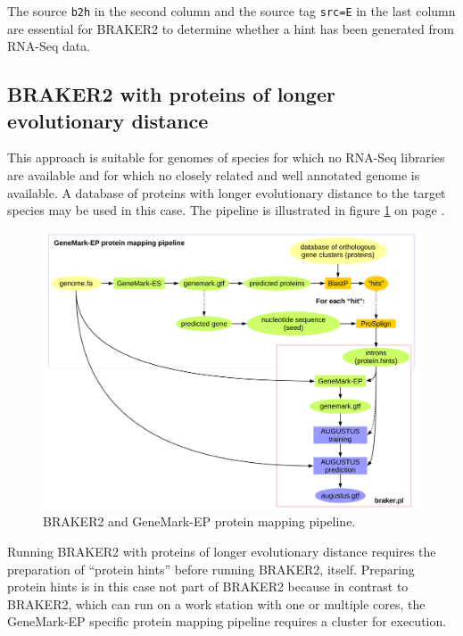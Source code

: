 \documentclass[a4paper,10pt]{report}
\begin{document}
The source \texttt{b2h} in the second column and the source tag \texttt{src=E} in the last column are essential for BRAKER2 to determine whether a hint has been generated from RNA-Seq data. 

\subsection{BRAKER2 with proteins of longer evolutionary distance}

This approach is suitable for genomes of species for which no RNA-Seq libraries are available and for which no closely related and well annotated genome is available. A database of proteins with longer evolutionary distance to the target species may be used in this case. The pipeline is illustrated in figure \ref{gatech} on page \pageref{gatech}.

\begin{figure}
 \centering
 \includegraphics[scale=0.4]{./figs/gatech-prot-pipeline.pdf}
 \caption{BRAKER2 and GeneMark-EP protein mapping pipeline.}
 \label{gatech}
\end{figure}

Running BRAKER2 with proteins of longer evolutionary distance requires the preparation of ``protein hints'' before running BRAKER2, itself. Preparing protein hints is in this case not part of BRAKER2 because in contrast to BRAKER2, which can run on a work station with one or multiple cores, the GeneMark-EP specific protein mapping pipeline requires a cluster for execution.
\end{document}
